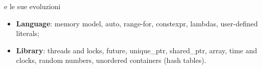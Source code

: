 \documentclass[xcolor={dvipsnames, svgnames, x11names, table}, 10pt]{beamer}
\begin{document}
\begin{frame}[fragile]{\cplusplus e le sue evoluzioni}
\begin{itemize}[<+- | alert@+>]
        \begin{itemize}\footnotesize
            \item \textbf{Language}: memory model, auto, range-for, constexpr, lambdas, user-defined literals;
            \item \textbf{Library}: threads and locks, future, unique\_ptr, shared\_ptr, array, time and clocks, random numbers, unordered containers (hash tables).
        \end{itemize}
    \end{itemize}
    
\end{frame}
\end{document}
